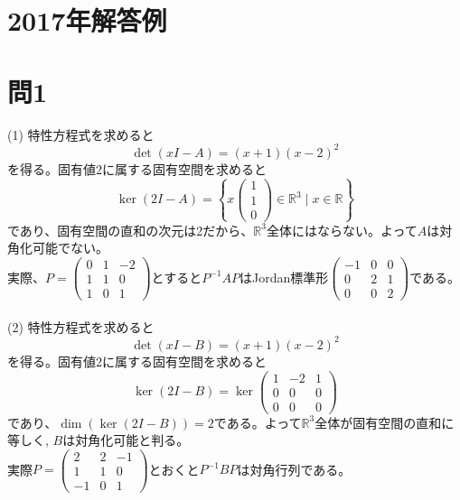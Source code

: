 ﻿\documentclass{jsarticle}
\begin{document}
\newpage
\section*{2017年解答例}

\section*{問1}
\noindent
(1) 特性方程式を求めると
$$
\det(xI - A) = (x + 1)(x - 2)^2
$$
を得る。固有値2に属する固有空間を求めると
$$
\ker(2I - A) = \left \{ x \begin{pmatrix} 1 \\ 1 \\ 0 \end{pmatrix} \in \mathbb{R}^3 \mid x \in \mathbb{R} \right \}
$$
であり、固有空間の直和の次元は2だから、$\mathbb{R}^3 $全体にはならない。よって$A$は対角化可能でない。\\
実際、$P = \begin{pmatrix} 0&1&-2 \\ 1&1&0 \\ 1&0&1 \end{pmatrix}$とすると$P^{-1}AP$はJordan標準形$\begin{pmatrix} -1&0&0 \\ 0&2&1 \\ 0&0&2 \end{pmatrix}$である。\\ \\

\noindent
(2) 特性方程式を求めると
$$
\det(xI - B) = (x + 1)(x - 2)^2
$$
を得る。固有値2に属する固有空間を求めると
$$
\ker(2I - B) = \ker \begin{pmatrix} 1&-2&1 \\ 0&0&0 \\ 0&0&0 \end{pmatrix}
$$
であり、$\dim (\ker (2I - B)) = 2$である。よって$\mathbb{R}^3$全体が固有空間の直和に等しく, $B$は対角化可能と判る。\\
実際$P = \begin{pmatrix} 2&2&-1 \\ 1&1&0 \\ -1&0&1 \end{pmatrix}$とおくと$P^{-1} BP$は対角行列である。\\ \\
\end{document}
